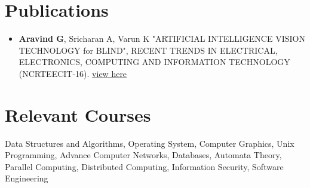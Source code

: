 \documentclass[margin, centered]{res}
\begin{document}
\begin{resume}

\section{Publications}
\begin{itemize}[leftmargin=*]

\item \textbf{Aravind G}, Sricharan A, Varun K "ARTIFICIAL INTELLIGENCE VISION
TECHNOLOGY for BLIND", RECENT TRENDS IN ELECTRICAL, ELECTRONICS, COMPUTING AND INFORMATION TECHNOLOGY (NCRTEECIT-16). \href{https://drive.google.com/open?id=0By03r7DCQ78FbTZpeWtDM1ZjSVl2ekMzNmNCeGZ0MGpjMEZN}{view here}
\end{itemize}

\section{Relevant \hspace{2mm} Courses}
Data Structures and Algorithms, Operating System, Computer Graphics, Unix Programming, Advance Computer Networks, Databases, Automata Theory, Parallel Computing, Distributed Computing, Information Security, Software Engineering


\end{resume}
\end{document}
